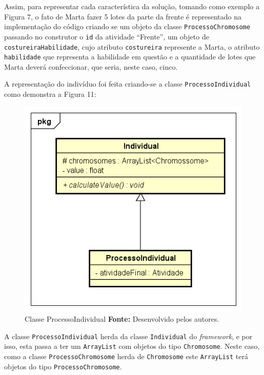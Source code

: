 \par Assim, para representar cada característica da solução, tomando como
exemplo a Figura 7, o fato de Marta fazer 5 lotes da parte da frente é representado na implementação
do código criando se um objeto da classe \texttt{ProcessoChromosome} passando no
construtor o \texttt{id} da atividade ``Frente'', um objeto de
\texttt{costureiraHabilidade}, cujo atributo \texttt{costureira} represente a
Marta, o atributo \texttt{habilidade} que representa a habilidade em questão e a
quantidade de lotes que Marta deverá confeccionar, que seria, neste caso, cinco.

\par A representação do indivíduo foi feita criando-se a classe \texttt{ProcessoIndividual} 
como demonstra a Figura 11:


\begin{figure}[h!]
	\centerline{\includegraphics[scale=0.9]{./imagens/class_individual.png}}
	\caption[Classe ProcessoIndividual]
	{Classe ProcessoIndividual \textbf{Fonte:} Desenvolvido pelos autores.}
	\label{fig:exemplo1}
\end{figure}

\par A classe \texttt{ProcessoIndividual} herda da classe \texttt{Individual} do
\textit{framework}, e por isso, esta passa a ter um \texttt{ArrayList} com
objetos do tipo \texttt{Chromosome}. Neste caso, como a classe \texttt{ProcessoChromosome} herda de \texttt{Chromosome} 
este \texttt{ArrayList} terá objetos do tipo \texttt{ProcessoChromosome}.

